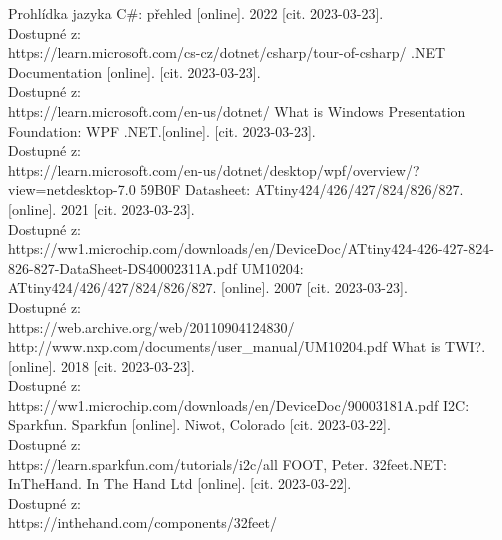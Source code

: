 \documentclass[12pt]{book}
\begin{document}
\begin{thebibliography}{99}
Prohlídka jazyka C\#: přehled [online]. 2022 [cit. 2023-03-23].\\ Dostupné z:\\ https://learn.microsoft.com/cs-cz/dotnet/csharp/tour-of-csharp/
.NET Documentation [online]. [cit. 2023-03-23].\\ Dostupné z:\\ https://learn.microsoft.com/en-us/dotnet/
What is Windows Presentation Foundation: WPF .NET.[online]. [cit. 2023-03-23].\\ Dostupné z:\\ https://learn.microsoft.com/en-us/dotnet/desktop/wpf/overview/?view=netdesktop-7.0
59B0F Datasheet: ATtiny424/426/427/824/826/827. [online]. 2021 [cit. 2023-03-23].\\ Dostupné z:\\ https://ww1.microchip.com/downloads/en/DeviceDoc/ATtiny424-426-427-824-826-827-DataSheet-DS40002311A.pdf
UM10204: ATtiny424/426/427/824/826/827. [online]. 2007 [cit. 2023-03-23].\\ Dostupné z:\\ https://web.archive.org/web/20110904124830/\\http://www.nxp.com/documents/user\_manual/UM10204.pdf
What is TWI?. [online]. 2018 [cit. 2023-03-23].\\ Dostupné z:\\ https://ww1.microchip.com/downloads/en/DeviceDoc/90003181A.pdf
I2C: Sparkfun. Sparkfun [online]. Niwot, Colorado [cit. 2023-03-22].\\ Dostupné z:\\ https://learn.sparkfun.com/tutorials/i2c/all
FOOT, Peter. 32feet.NET: InTheHand. In The Hand Ltd [online]. [cit. 2023-03-22].\\ Dostupné z:\\ https://inthehand.com/components/32feet/
\end{thebibliography}
\listoffigures
\end{document}
